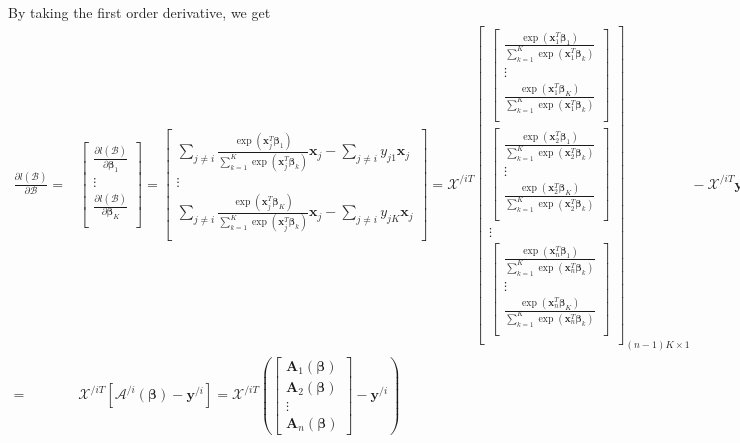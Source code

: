 \documentclass[letter]{article}
\begin{document}
	By taking the first order derivative, we get
	$$\begin{aligned}
	\frac{\partial l(\bm{\mathcal{B}})}{\partial\bm{\mathcal{B}}}=&
	\begin{bmatrix}
	\frac{\partial l(\bm{\mathcal{B}})}{\partial\bm{\beta}_{1}} \\
	\vdots \\
	\frac{\partial l(\bm{\mathcal{B}})}{\partial\bm{\beta}_{K}} \\
	\end{bmatrix}=
	\begin{bmatrix}
	\sum_{j\neq i}\frac{\exp\left(\bm{x}_j^T\bm{\beta}_1\right)}{\sum_{k=1}^K\exp\left(\bm{x}_j^T\bm{\beta}_k\right)}\bm{x}_j-
	\sum_{j\neq i}y_{j1}\bm{x}_j \\
	\vdots \\
	\sum_{j\neq i}\frac{\exp\left(\bm{x}_j^T\bm{\beta}_K\right)}{\sum_{k=1}^K\exp\left(\bm{x}_j^T\bm{\beta}_k\right)}\bm{x}_j-
	\sum_{j\neq i}y_{jK}\bm{x}_j \\
	\end{bmatrix} 
	=\bm{\mathcal{X}}^{/iT}\begin{bmatrix}
	\begin{bmatrix}\frac{\exp\left(\bm{x}_1^T\bm{\beta}_1\right)}{\sum_{k=1}^K\exp\left(\bm{x}_1^T\bm{\beta}_k\right)} \\
	\vdots \\
	\frac{\exp\left(\bm{x}_1^T\bm{\beta}_K\right)}{\sum_{k=1}^K\exp\left(\bm{x}_1^T\bm{\beta}_k\right)} \\
	\end{bmatrix} \\
	\begin{bmatrix}
	\frac{\exp\left(\bm{x}_2^T\bm{\beta}_1\right)}{\sum_{k=1}^K\exp\left(\bm{x}_2^T\bm{\beta}_k\right)} \\
	\vdots \\
	\frac{\exp\left(\bm{x}_2^T\bm{\beta}_K\right)}{\sum_{k=1}^K\exp\left(\bm{x}_2^T\bm{\beta}_k\right)} \\
	\end{bmatrix} \\
	\vdots \\
	\begin{bmatrix}
	\frac{\exp\left(\bm{x}_n^T\bm{\beta}_1\right)}{\sum_{k=1}^K\exp\left(\bm{x}_n^T\bm{\beta}_k\right)} \\
	\vdots \\
	\frac{\exp\left(\bm{x}_n^T\bm{\beta}_K\right)}{\sum_{k=1}^K\exp\left(\bm{x}_n^T\bm{\beta}_k\right)} \\
	\end{bmatrix} \\
	\end{bmatrix}_{(n-1)K\times1}-\bm{\mathcal{X}}^{/iT}\bm{y}^{/i} \\
	=&\bm{\mathcal{X}}^{/iT}\left[\bm{\mathcal{A}}^{/i}(\bm{\beta})-\bm{y}^{/i}\right]=\bm{\mathcal{X}}^{/iT}\left(
	\begin{bmatrix}
	\bm{A}_1(\bm{\beta}) \\
	\bm{A}_2(\bm{\beta}) \\
	\vdots \\
	\bm{A}_n(\bm{\beta})
	\end{bmatrix}-\bm{y}^{/i}\right)
	\end{aligned}$$
\end{document}
